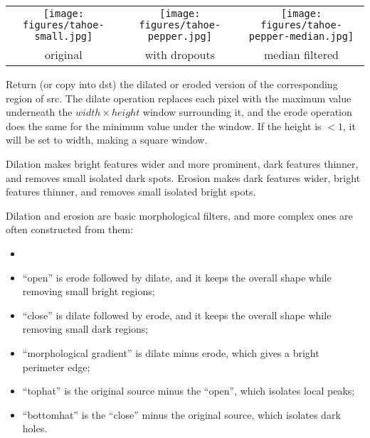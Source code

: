 \spc \begin{tabular}{ccc}
\texttt{[image: figures/tahoe-small.jpg]} &
\texttt{[image: figures/tahoe-pepper.jpg]} &
\texttt{[image: figures/tahoe-pepper-median.jpg]} \\
original & with dropouts & median filtered \\
\end{tabular}

\apiend


 
 

Return (or copy into {\cf dst}) the dilated or eroded version of the
corresponding region of {\cf src}.  The dilate operation replaces each pixel
with the maximum value underneath the $\mathit{width} \times \mathit{height}$
window surrounding it, and the erode operation does the same for the minimum
value under the window. If the height is $< 1$, it will be set to width,
making a square window.

Dilation makes bright features wider and more prominent, dark features
thinner, and removes small isolated dark spots. Erosion makes dark features
wider, bright features thinner, and removes small isolated bright spots.

Dilation and erosion are basic morphological filters, and more complex ones
are often constructed from them:
\begin{itemize}
\item
\item ``open'' is erode followed by dilate, and it keeps the overall shape
while removing small bright regions;
\item ``close'' is dilate followed by erode, and it keeps the overall shape
while removing small dark regions;
\item ``morphological gradient'' is dilate minus erode, which gives a
bright perimeter edge;
\item ``tophat'' is the original source minus the ``open'', which isolates
local peaks;
\item ``bottomhat'' is the ``close'' minus the original source, which
isolates dark holes.
\end{itemize}

